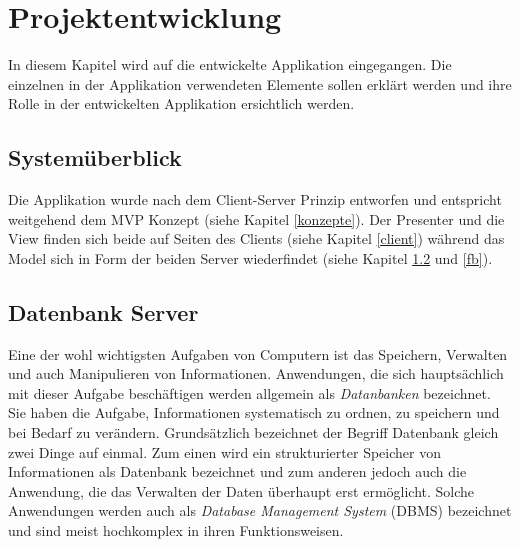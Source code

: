 \documentclass[a4paper,11pt]{report}
\begin{document}
	
	\chapter{Projektentwicklung}
	In diesem Kapitel wird auf die entwickelte Applikation eingegangen. Die einzelnen in der Applikation verwendeten Elemente sollen erklärt werden und ihre Rolle in der entwickelten Applikation ersichtlich werden.
		\section{Systemüberblick}
		Die Applikation wurde nach dem Client-Server Prinzip entworfen und entspricht weitgehend dem MVP Konzept (siehe Kapitel \ref{konzepte}). Der Presenter und die View finden sich beide auf Seiten des Clients (siehe Kapitel \ref{client}) während das Model sich in Form der beiden Server wiederfindet (siehe Kapitel \ref{server} und \ref{fb}).
		
			\section{Datenbank Server} \label{server}
			Eine der wohl wichtigsten Aufgaben von Computern ist das Speichern, Verwalten und auch Manipulieren von Informationen. Anwendungen, die sich hauptsächlich mit dieser Aufgabe beschäftigen werden allgemein als \emph{Datanbanken} bezeichnet. Sie haben die Aufgabe, Informationen systematisch zu ordnen, zu speichern und bei Bedarf zu verändern. Grundsätzlich bezeichnet der Begriff Datenbank gleich zwei Dinge auf einmal. Zum einen wird ein strukturierter Speicher von Informationen als Datenbank bezeichnet und zum anderen jedoch auch die Anwendung, die das Verwalten der Daten überhaupt erst ermöglicht. Solche Anwendungen werden auch als \emph{Database Management System} (DBMS) bezeichnet und sind meist hochkomplex in ihren Funktionsweisen. \cite{IT-Handbuch}
			
\end{document}
